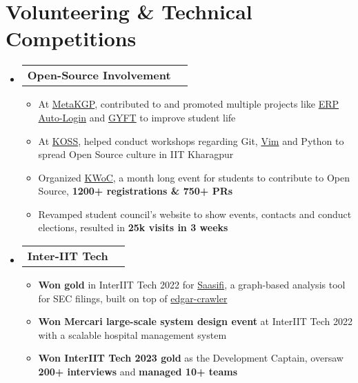 \documentclass[letterpaper,11pt]{article}
\makeatletter
\newcommand{\resumeItem}[1]{
  \item\small{
    {#1 \vspace{-2pt}}
  }
}
\newcommand{\resumeSubSubheading}[2]{
    \item
    \begin{tabular*}{0.97\textwidth}{l@{\extracolsep{\fill}}r}
      \textbf{\small#1} & \textbf{\small #2} \\
    \end{tabular*}\vspace{-7pt}
}
\newcommand{\resumeSubHeadingListStart}{\begin{itemize}[leftmargin=0.0in, label={}]}
\newcommand{\resumeSubHeadingListEnd}{\end{itemize}}
\newcommand{\resumeItemListStart}{\begin{itemize}}
\newcommand{\resumeItemListEnd}{\end{itemize}\vspace{-5pt}}
\makeatother
\begin{document}
\section{Volunteering \& Technical Competitions}
%
\resumeSubHeadingListStart
    \resumeSubSubheading{\textbf{Open-Source Involvement}}{}
    \resumeItemListStart
        \resumeItem{At \href{https://metakgp.github.io/}{MetaKGP}, contributed to and promoted multiple projects like \href{https://github.com/metakgp/erp-auto-login}{ERP Auto-Login} and \href{https://github.com/metakgp/gyft-serve}{GYFT} to improve student life}
        \resumeItem{At \href{https://kossiitkgp.org/}{KOSS}, helped conduct workshops regarding Git, \href{https://www.youtube.com/watch?v=4zNbLz7ugBo}{Vim} and Python to spread Open Source culture in IIT Kharagpur}
        \resumeItem{Organized \href{https://kwoc21.kossiitkgp.org/}{KWoC}, a month long event for students to contribute to Open Source, \textbf{1200+ registrations \& 750+ PRs}}
\resumeItem{Revamped student council's website to show events, contacts and conduct elections, resulted in \textbf{25k visits in 3 weeks}}
    \resumeItemListEnd
%
    \resumeSubSubheading{\textbf{Inter-IIT Tech}}{}
    \resumeItemListStart
        \resumeItem{\textbf{Won gold} in InterIIT Tech 2022 for {\href{https://github.com/pinter-pi-pi-tea/documentation/blob/main/Documentation.md} {Saasifi}}, a graph-based analysis tool for SEC filings, built on top of \href{https://github.com/nlpaueb/edgar-crawler}{edgar-crawler}}
        \resumeItem{\textbf{Won Mercari large-scale system design event} at InterIIT Tech 2022 with a scalable hospital management system}
        \resumeItem{\textbf{Won InterIIT Tech 2023 gold} as the Development Captain, oversaw \textbf{200+ interviews} and \textbf{managed 10+ teams}}
    \resumeItemListEnd
    \resumeSubHeadingListEnd
\end{document}
